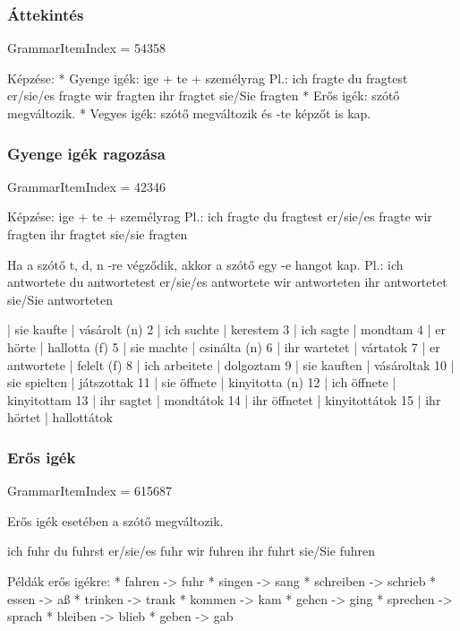 \documentclass{article}
\newenvironment{desc}{\verbatim}{\endverbatim}
\newenvironment{exmp}{\verbatim}{\endverbatim}
\begin{document}
\subsubsection{Áttekintés}

GrammarItemIndex = 54358

\begin{desc}
Képzése:
* Gyenge igék: ige + te + személyrag
  Pl.: ich fragte 
       du fragtest 
       er/sie/es fragte 
       wir fragten 
       ihr fragtet 
       sie/Sie fragten
* Erős igék: szótő megváltozik.
* Vegyes igék: szótő megváltozik és -te képzőt is kap.
\end{desc}

\subsubsection{Gyenge igék ragozása}

GrammarItemIndex = 42346

\begin{desc}
Képzése: ige + te + személyrag
Pl.:
ich fragte
du fragtest
er/sie/es fragte
wir fragten
ihr fragtet
sie/sie fragten

Ha a szótő t, d, n -re végződik, akkor a szótő egy -e hangot kap.
Pl.:
ich antwortete
du antwortetest
er/sie/es antwortete
wir antworteten
ihr antwortetet
sie/Sie antworteten
\end{desc}

\begin{exmp}
1 | sie kaufte | vásárolt (n)
2 | ich suchte | kerestem
3 | ich sagte | mondtam
4 | er hörte | hallotta (f)
5 | sie machte | csinálta (n)
6 | ihr wartetet | vártatok
7 | er antwortete | felelt (f)
8 | ich arbeitete | dolgoztam
9 | sie kauften | vásároltak
10 | sie spielten | játszottak
11 | sie öffnete | kinyitotta (n)
12 | ich öffnete | kinyitottam
13 | ihr sagtet | mondtátok
14 | ihr öffnetet | kinyitottátok
15 | ihr hörtet | hallottátok
\end{exmp}

\subsubsection{Erős igék}

GrammarItemIndex = 615687

\begin{desc}
Erős igék esetében a szótő megváltozik.

ich fuhr
du fuhrst
er/sie/es fuhr
wir fuhren
ihr fuhrt
sie/Sie fuhren

Példák erős igékre:
* fahren -> fuhr
* singen -> sang
* schreiben -> schrieb
* essen -> aß
* trinken -> trank
* kommen -> kam
* gehen -> ging
* sprechen -> sprach
* bleiben -> blieb
* geben -> gab
\end{desc}
\end{document}
